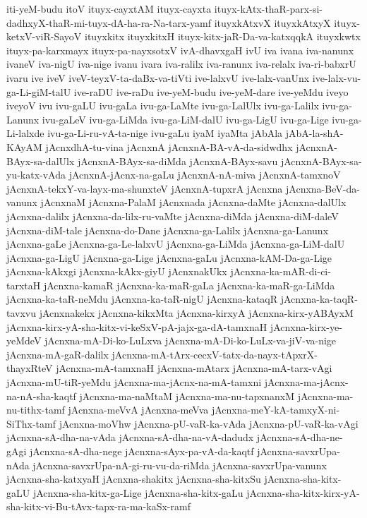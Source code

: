 {iti-yeM-budu
itoV
ituyx-cayxtAM
ituyx-cayxta
ituyx-kAtx-thaR-parx-si-dadhxyX-thaR-mi-tuyx-dA-ha-ra-Na-tarx-yamf
ituyxkAtxvX
ituyxkAtxyX
ituyx-ketxV-viR-SayoV
ituyxkitx
ituyxkitxH
ituyx-kitx-jaR-Da-va-katxqqkA
ituyxkwtx
ituyx-pa-karxmayx
ituyx-pa-nayxsotxV
ivA-dhavxgaH
ivU
iva
ivana
iva-nanunx
ivaneV
iva-nigU
iva-nige
ivanu
ivara
iva-ralilx
iva-ranunx
iva-relalx
iva-ri-babxrU
ivaru
ive
iveV
iveV-teyxV-ta-daBx-va-tiVti
ive-lalxvU
ive-lalx-vanUnx
ive-lalx-vu-ga-Li-giM-talU
ive-raDU
ive-raDu
ive-yeM-budu
ive-yeM-dare
ive-yeMdu
iveyo
iveyoV
ivu
ivu-gaLU
ivu-gaLa
ivu-ga-LaMte
ivu-ga-LalUlx
ivu-ga-Lalilx
ivu-ga-Lanunx
ivu-gaLeV
ivu-ga-LiMda
ivu-ga-LiM-dalU
ivu-ga-LigU
ivu-ga-Lige
ivu-ga-Li-lalxde
ivu-ga-Li-ru-vA-ta-nige
ivu-gaLu
iyaM
iyaMta
jAbAla
jAbA-la-shA-KAyAM
jAcnxdhA-tu-vina
jAcnxnA
jAcnxnA-BA-vA-da-sidwdhx
jAcnxnA-BAyx-sa-dalUlx
jAcnxnA-BAyx-sa-diMda
jAcnxnA-BAyx-savu
jAcnxnA-BAyx-sa-yu-katx-vAda
jAcnxnA-jAcnx-na-gaLu
jAcnxnA-nA-miva
jAcnxnA-tamxnoV
jAcnxnA-tekxY-va-layx-ma-shunxteV
jAcnxnA-tupxrA
jAcnxna
jAcnxna-BeV-da-vanunx
jAcnxnaM
jAcnxna-PalaM
jAcnxnada
jAcnxna-daMte
jAcnxna-dalUlx
jAcnxna-dalilx
jAcnxna-da-lilx-ru-vaMte
jAcnxna-diMda
jAcnxna-diM-daleV
jAcnxna-diM-tale
jAcnxna-do-Dane
jAcnxna-ga-Lalilx
jAcnxna-ga-Lanunx
jAcnxna-gaLe
jAcnxna-ga-Le-lalxvU
jAcnxna-ga-LiMda
jAcnxna-ga-LiM-dalU
jAcnxna-ga-LigU
jAcnxna-ga-Lige
jAcnxna-gaLu
jAcnxna-kAM-Da-ga-Lige
jAcnxna-kAkxgi
jAcnxna-kAkx-giyU
jAcnxnakUkx
jAcnxna-ka-mAR-di-ci-tarxtaH
jAcnxna-kamaR
jAcnxna-ka-maR-gaLa
jAcnxna-ka-maR-ga-LiMda
jAcnxna-ka-taR-neMdu
jAcnxna-ka-taR-nigU
jAcnxna-kataqR
jAcnxna-ka-taqR-tavxvu
jAcnxnakekx
jAcnxna-kikxMta
jAcnxna-kirxyA
jAcnxna-kirx-yABAyxM
jAcnxna-kirx-yA-sha-kitx-vi-keSxV-pA-jajx-ga-dA-tamxnaH
jAcnxna-kirx-ye-yeMdeV
jAcnxna-mA-Di-ko-LuLxva
jAcnxna-mA-Di-ko-LuLx-va-jiV-va-nige
jAcnxna-mA-gaR-dalilx
jAcnxna-mA-tArx-cecxV-tatx-da-nayx-tApxrX-thayxRteV
jAcnxna-mA-tamxnaH
jAcnxna-mAtarx
jAcnxna-mA-tarx-vAgi
jAcnxna-mU-tiR-yeMdu
jAcnxna-ma-jAcnx-na-mA-tamxni
jAcnxna-ma-jAcnx-na-nA-sha-kaqtf
jAcnxna-ma-naMtaM
jAcnxna-ma-nu-tapxnanxM
jAcnxna-ma-nu-tithx-tamf
jAcnxna-meVvA
jAcnxna-meVva
jAcnxna-meY-kA-tamxyX-ni-SiThx-tamf
jAcnxna-moVhw
jAcnxna-pU-vaR-ka-vAda
jAcnxna-pU-vaR-ka-vAgi
jAcnxna-sA-dha-na-vAda
jAcnxna-sA-dha-na-vA-dadudx
jAcnxna-sA-dha-ne-gAgi
jAcnxna-sA-dha-nege
jAcnxna-sAyx-pa-vA-da-kaqtf
jAcnxna-savxrUpa-nAda
jAcnxna-savxrUpa-nA-gi-ru-vu-da-riMda
jAcnxna-savxrUpa-vanunx
jAcnxna-sha-katxyaH
jAcnxna-shakitx
jAcnxna-sha-kitxSu
jAcnxna-sha-kitx-gaLU
jAcnxna-sha-kitx-ga-Lige
jAcnxna-sha-kitx-gaLu
jAcnxna-sha-kitx-kirx-yA-sha-kitx-vi-Bu-tAvx-tapx-ra-ma-kaSx-ramf
}
